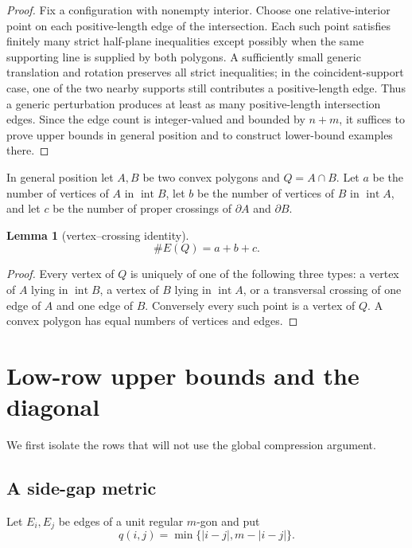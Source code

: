 \documentclass[11pt]{article}
\newtheorem{lemma}[theorem]{Lemma}
\theoremstyle{remark}
\begin{document}
\begin{proof}
Fix a configuration with nonempty interior. Choose one relative-interior point on each positive-length edge of the intersection. Each such point satisfies finitely many strict half-plane inequalities except possibly when the same supporting line is supplied by both polygons. A sufficiently small generic translation and rotation preserves all strict inequalities; in the coincident-support case, one of the two nearby supports still contributes a positive-length edge. Thus a generic perturbation produces at least as many positive-length intersection edges. Since the edge count is integer-valued and bounded by $n+m$, it suffices to prove upper bounds in general position and to construct lower-bound examples there.
\end{proof}

In general position let $A,B$ be two convex polygons and $Q=A\cap B$. Let $a$ be the number of vertices of $A$ in $\operatorname{int}B$, let $b$ be the number of vertices of $B$ in $\operatorname{int}A$, and let $c$ be the number of proper crossings of $\partial A$ and $\partial B$.

\begin{lemma}[vertex--crossing identity]\label{lem:abc}
\[
\#E(Q)=a+b+c.
\]
\end{lemma}

\begin{proof}
Every vertex of $Q$ is uniquely of one of the following three types: a vertex of $A$ lying in $\operatorname{int}B$, a vertex of $B$ lying in $\operatorname{int}A$, or a transversal crossing of one edge of $A$ and one edge of $B$. Conversely every such point is a vertex of $Q$. A convex polygon has equal numbers of vertices and edges.
\end{proof}

\section{Low-row upper bounds and the diagonal}\label{sec:lowrows}

We first isolate the rows that will not use the global compression argument.

\subsection{A side-gap metric}

Let $E_i,E_j$ be edges of a unit regular $m$-gon and put
\[
q(i,j)=\min\{|i-j|,m-|i-j|\}.
\]
\end{document}
